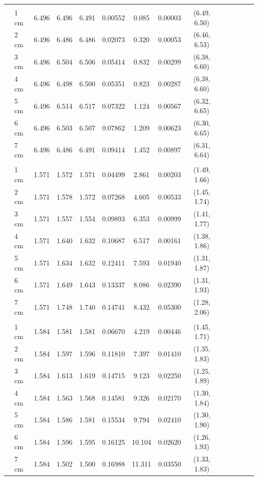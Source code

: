 \documentclass[a4paper 12pt]{article}
\numberwithin{equation}{section}
\begin{document}
\begin{small}
\begin{table}[h!]
\begin{footnotesize}
\begin{tabular}{clclclclclclcl}
 \raisebox{1ex}{\bf age 2}  \\ [1.0ex]
&    1 cm & 6.496 &    6.496 & 6.491 &          0.00552& 0.085 & 0.00003 & (6.49, 6.50)\\
&    2 cm & 6.496 &    6.486 & 6.486 &          0.02073& 0.320 & 0.00053 & (6.46, 6.53)\\
&    3 cm & 6.496 &    6.504 & 6.506 &          0.05414& 0.832 & 0.00299 & (6.38, 6.60)\\
&    4 cm & 6.496 &    6.498 & 6.500 &          0.05351& 0.823 & 0.00287 & (6.38, 6.60)\\
&    5 cm & 6.496 &    6.514 & 6.517 &          0.07322& 1.124 & 0.00567 & (6.32, 6.65)\\
&    6 cm & 6.496 &    6.503 & 6.507 &          0.07862& 1.209 & 0.00623 & (6.30, 6.65)\\
&    7 cm & 6.496 &    6.486 & 6.491 &          0.09414& 1.452 & 0.00897 & (6.31, 6.64)\\[1.5ex]

 \raisebox{1ex}{\bf age 3}  \\ [1.0ex]
&   1 cm & 1.571 &    1.572  & 1.571 &         0.04499& 2.861  & 0.00203 & (1.49, 1.66)\\
&   2 cm & 1.571 &    1.578  & 1.572 &         0.07268& 4.605  & 0.00533 & (1.45, 1.74)\\
&   3 cm & 1.571 &    1.557  & 1.554 &         0.09893& 6.353  & 0.00999 & (1.41, 1.77)\\
&   4 cm & 1.571 &    1.640  & 1.632 &         0.10687& 6.517  & 0.00161 & (1.38, 1.86)\\
&   5 cm & 1.571 &    1.634  & 1.632 &         0.12411& 7.593  & 0.01940 & (1.31, 1.87)\\
&   6 cm & 1.571 &    1.649  & 1.643 &         0.13337& 8.086  & 0.02390 & (1.31, 1.93)\\
&   7 cm & 1.571 &    1.748  & 1.740 &         0.14741& 8.432  & 0.05300 & (1.28, 2.06) \\[1.5ex]

 \raisebox{1ex}{\bf age 4}  \\ [1.0ex]
&   1 cm & 1.584 &    1.581  & 1.581 &         0.06670& 4.219   & 0.00446 & (1.45, 1.71)\\
&   2 cm & 1.584 &    1.597  & 1.596 &         0.11810& 7.397   & 0.01410 & (1.35, 1.83)\\
&   3 cm & 1.584 &    1.613  & 1.619 &         0.14715& 9.123   & 0.02250 & (1.25, 1.89)\\
&   4 cm & 1.584 &    1.563  & 1.568 &         0.14581& 9.326   & 0.02170 & (1.30, 1.84)\\
&   5 cm & 1.584 &    1.586  & 1.581 &         0.15534& 9.794   & 0.02410 & (1.30, 1.90)\\
&   6 cm & 1.584 &    1.596  & 1.595 &         0.16125& 10.104  & 0.02620 & (1.26, 1.93)\\
&   7 cm & 1.584 &    1.502  & 1.500 &         0.16988& 11.311  & 0.03550 & (1.33, 1.83) \\[1.5ex]


\end{tabular}
\end{footnotesize}
\end{table}
\end{small}
\end{document}
